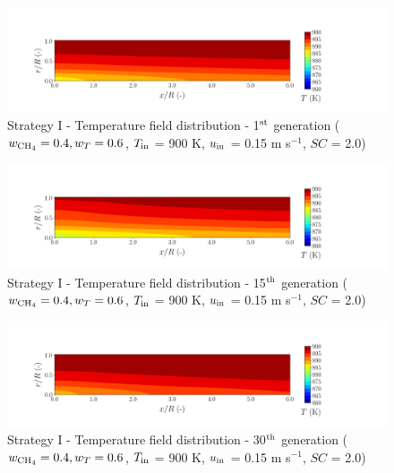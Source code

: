 \documentclass[preprint,12pt]{elsarticle}
\begin{document}
\begin{figure}[h!]
\centering
\includegraphics[width=190mm]{results/5/40C_60T/GEN1-TFIELD.png}
\caption{\label{fig:5R4060G1-TField} Strategy I - Temperature field distribution - 1$^{\rm{st}}$ generation ($w_{\rm{CH_4}} = 0.4, w_T = 0.6$, $T_{\rm{in}}$ = 900 K, $u_{\rm{in}}$ = 0.15 m s$^{-1}$, $SC$ = 2.0)}
\end{figure}

\begin{figure}[h!]
\centering
\includegraphics[width=190mm]{results/5/40C_60T/GEN15-TFIELD.png}
\caption{\label{fig:5R4060G15-TField} Strategy I - Temperature field distribution - 15$^{\rm{th}}$ generation ($w_{\rm{CH_4}} = 0.4, w_T = 0.6$, $T_{\rm{in}}$ = 900 K, $u_{\rm{in}}$ = 0.15 m s$^{-1}$, $SC$ = 2.0)}
\end{figure}

\begin{figure}[h!]
\centering
\includegraphics[width=190mm]{results/5/40C_60T/GEN30-TFIELD.png}
\caption{\label{fig:5R4060G30-TField} Strategy I - Temperature field distribution - 30$^{\rm{th}}$ generation ($w_{\rm{CH_4}} = 0.4, w_T = 0.6$, $T_{\rm{in}}$ = 900 K, $u_{\rm{in}}$ = 0.15 m s$^{-1}$, $SC$ = 2.0)}
\end{figure}
\end{document}

